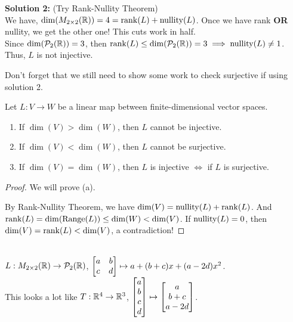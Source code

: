 \begin{example}
        \vspace{2mm}
        \textbf{Solution 2:} (Try Rank-Nullity Theorem) \\
        We have, $\dim(M_{2 \times 2}({\mathbb{R}})) = 4 = \operatorname{rank}(L) + \operatorname{nullity}(L)$. Once we have rank \textbf{OR} nullity, we get the other one! This cuts work in half. \\
        Since $\dim(\mathcal{P}_2({\mathbb{R}})) = 3$, then $\operatorname{rank}(L) \leq \dim(\mathcal{P}_2({\mathbb{R}})) = 3 \implies \operatorname{nullity}(L) \neq 1$. Thus, $L$ is not injective.

        \begin{note}
            Don't forget that we still need to show some work to check surjective if using solution 2.
        \end{note}
\end{example}

\begin{theorem}
    \phantom{}
    Let $L:V \to W$ be a linear map between finite-dimensional vector spaces. 
    \begin{enumerate}[label=(\alph*)]
        \item If $\dim(V) > \dim(W)$, then $L$ cannot be injective.
        \item If $\dim(V) < \dim(W)$, then $L$ cannot be surjective. 
        \item If $\dim(V) = \dim(W)$, then $L$ is injective $\iff$ if $L$ is surjective.
    \end{enumerate}
\end{theorem}

\begin{proof}
    We will prove (a).
    
    By Rank-Nullity Theorem, we have $\dim(V) = \operatorname{nullity}(L) + \operatorname{rank}(L)$. And $\operatorname{rank}(L) = \dim(\operatorname{Range}(L)) \leq \dim(W) < \dim(V)$. If $\operatorname{nullity}(L) = 0$,
    then $\dim(V) = \operatorname{rank}(L) < \dim(V)$, a contradiction!
\end{proof}

\begin{example}
    \phantom{}\\
    $L:M_{2 \times 2}({\mathbb{R}}) \to \mathcal{P}_2({\mathbb{R}})$, $\begin{bmatrix} a & b \\ c & d \end{bmatrix} \mapsto a + (b+c)x + (a-2d)x^2$. \\
    This looks a lot like $T: {\mathbb{R}}^4 \to {\mathbb{R}}^3$, $\begin{bmatrix} a \\ b \\ c \\ d \end{bmatrix} \mapsto \begin{bmatrix} a \\ b+c \\ a-2d \end{bmatrix}$.
\end{example}

